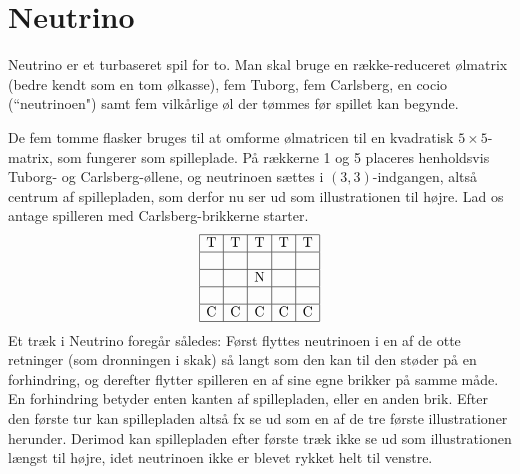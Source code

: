 \chapter{Neutrino}

Neutrino er et turbaseret spil for to. Man skal bruge en række-reduceret ølmatrix
(bedre kendt som en tom ølkasse), fem Tuborg, fem Carlsberg, en cocio (``neutrinoen") samt fem vilkårlige øl der tømmes før spillet kan begynde.

De fem tomme flasker bruges til at omforme ølmatricen til en kvadratisk $5 \times 5$-matrix, som fungerer som spilleplade. På rækkerne 1 og 5 placeres henholdsvis Tuborg- og Carlsberg-øllene, og neutrinoen sættes i $(3, 3)$-indgangen, altså centrum af spillepladen, som derfor nu ser ud som illustrationen til højre. Lad os antage spilleren med Carlsberg-brikkerne starter.
\[
\begin{array}{|c|c|c|c|c|}
		\hline
		\text{T} & \text{T} & \text{T} & \text{T} & \text{T} \\ 
		\hline
		&    &     &    &     \\ 
		\hline
		&   & \text{N} &    &     \\ 
		\hline
		&   &    &     &     \\ 
		\hline
		\text{C} & \text{C} & \text{C} & \text{C} & \text{C} \\ 
		\hline
\end{array}
\]
Et træk i Neutrino foregår således: Først flyttes neutrinoen i en af de otte retninger (som dronningen i skak) så langt som den kan til den støder på en forhindring, og derefter flytter spilleren en af sine egne brikker på samme måde. En forhindring betyder enten kanten af spillepladen, eller en anden brik. Efter den første tur kan spillepladen altså fx se ud som en af de tre første illustrationer herunder. Derimod kan spillepladen efter første træk ikke se ud som illustrationen længst til højre, idet neutrinoen ikke er blevet rykket helt til venstre.

